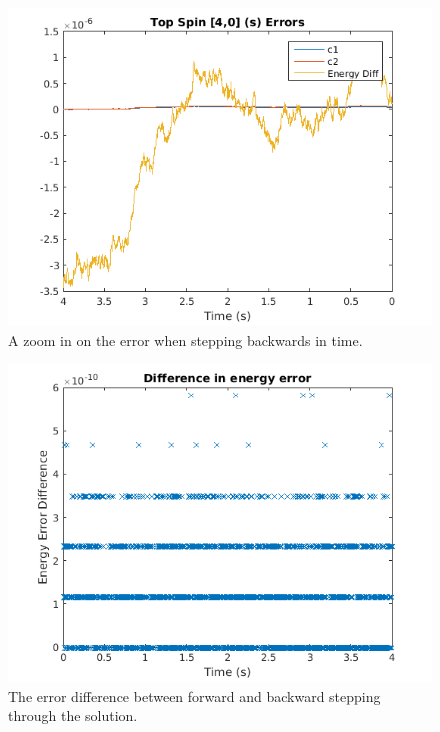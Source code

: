 \documentclass[11pt]{article}
\begin{document}
\begin{figure}[H]
	\centering
	\includegraphics[width=1\textwidth]{../ex2/plots/backwardDataError.png}
	\caption{A zoom in on the error when stepping backwards in time.}
	\label{fig:backwardDataError}
\end{figure}

\begin{figure}[H]
	\centering
	\includegraphics[width=1\textwidth]{../ex2/plots/energyErrorDiff.png}
	\caption{The error difference between forward and backward stepping through the solution.}
	\label{fig:energyErrorDiff}
\end{figure}
\end{document}
